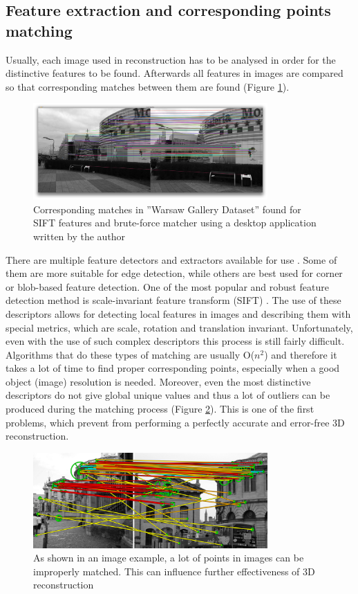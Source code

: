 \subsection{Feature extraction and corresponding points matching}
Usually, each image used in reconstruction has to be analysed in order for the distinctive features to be found. Afterwards all features in images are compared so that corresponding matches between them are found (Figure \ref{fig:correspondingMatches}).
\begin{figure}[h]
    \centering
    \includegraphics[width=0.8\textwidth]{correspondingMatching}
    \caption{Corresponding matches in ''Warsaw Gallery Dataset'' found for SIFT features and brute-force matcher using a desktop application written by the author }
    \label{fig:correspondingMatches}
\end{figure}
There are multiple feature detectors and extractors available for use \cite{website:featureDetection}. Some of them are more suitable for edge detection, while others are best used for corner or blob-based feature detection. One of the most popular and robust feature detection method is scale-invariant feature transform (SIFT) \cite{website:SIFT}. The use of these descriptors allows for detecting local features in images and describing them with special metrics, which are scale, rotation and translation invariant. Unfortunately, even with the use of such complex descriptors this process is still fairly difficult. Algorithms that do these types of matching are usually O($n^2$) and therefore it takes a lot of time to find proper corresponding points, especially when a good object (image) resolution is needed. Moreover, even the most distinctive descriptors do not give global unique values and thus a lot of outliers can be produced during the matching process (Figure \ref{fig:failMatching}). This is one of the first problems, which prevent from performing a perfectly accurate and error-free 3D reconstruction.
\begin{figure}[ht!]
    \centering
    \includegraphics[width=0.8\textwidth]{failMatching}
    \caption[Outliers found during correspondence matching in two architecture pictures]{As shown in an image example, a lot of points in images can be improperly matched. This can influence further effectiveness of 3D reconstruction \cite{website:failMatching} }
    \label{fig:failMatching}
\end{figure}
